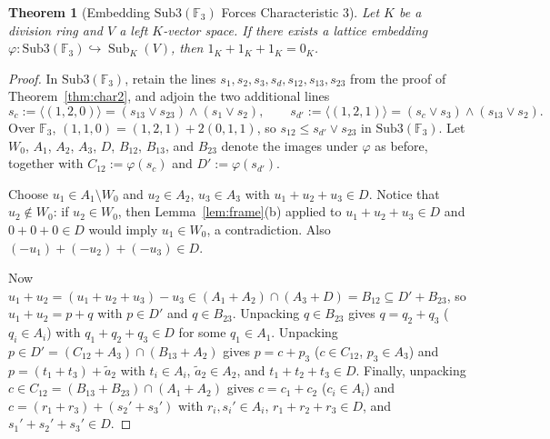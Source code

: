\documentclass[11pt]{article}
\newtheorem{theorem}{Theorem}[section]
\theoremstyle{definition}
\newcommand{\Sub}{\operatorname{Sub}}
\newcommand{\FF}{\mathbb{F}}
\begin{document}
\begin{theorem}[Embedding $\mathrm{Sub3}(\FF_3)$ Forces Characteristic $3$]\label{thm:char3}
Let $K$ be a division ring and $V$ a left $K$-vector space. If there exists a lattice
embedding $\varphi : \mathrm{Sub3}(\FF_3) \hookrightarrow \Sub_K(V)$, then
$1_K + 1_K + 1_K = 0_K$.
\end{theorem}
\begin{proof}
In $\mathrm{Sub3}(\FF_3)$, retain the lines $s_1, s_2, s_3, s_d, s_{12}, s_{13}, s_{23}$
from the proof of Theorem~\ref{thm:char2}, and adjoin the two additional lines
\[
  s_{c} := \langle (1, 2, 0) \rangle = (s_{13} \vee s_{23}) \wedge (s_1 \vee s_2), \qquad
  s_{d'} := \langle (1, 2, 1) \rangle = (s_c \vee s_3) \wedge (s_{13} \vee s_2).
\]
Over $\FF_3$, $(1, 1, 0) = (1, 2, 1) + 2(0, 1, 1)$, so $s_{12} \le s_{d'} \vee s_{23}$ in
$\mathrm{Sub3}(\FF_3)$. Let $W_0$, $A_1$, $A_2$, $A_3$, $D$, $B_{12}$, $B_{13}$, and
$B_{23}$ denote the images under $\varphi$ as before, together with
$C_{12} := \varphi(s_c)$ and $D' := \varphi(s_{d'})$.

Choose $u_1 \in A_1 \setminus W_0$ and $u_2 \in A_2$, $u_3 \in A_3$ with
$u_1 + u_2 + u_3 \in D$. Notice that $u_2 \notin W_0$: if $u_2 \in W_0$, then
Lemma~\ref{lem:frame}(b) applied to $u_1 + u_2 + u_3 \in D$ and $0 + 0 + 0 \in D$ would
imply $u_1 \in W_0$, a contradiction. Also $(-u_1) + (-u_2) + (-u_3) \in D$.

Now $u_1 + u_2 = (u_1 + u_2 + u_3) - u_3 \in (A_1 + A_2) \cap (A_3 + D) = B_{12}
\subseteq D' + B_{23}$, so $u_1 + u_2 = p + q$ with $p \in D'$ and $q \in B_{23}$.
Unpacking $q \in B_{23}$ gives $q = q_2 + q_3$ ($q_i \in A_i$) with
$q_1 + q_2 + q_3 \in D$ for some $q_1 \in A_1$. Unpacking
$p \in D' = (C_{12} + A_3) \cap (B_{13} + A_2)$ gives $p = c + p_3$ ($c \in C_{12}$,
$p_3 \in A_3$) and $p = (t_1 + t_3) + \tilde{a}_2$ with $t_i \in A_i$,
$\tilde{a}_2 \in A_2$, and $t_1 + t_2 + t_3 \in D$. Finally, unpacking
$c \in C_{12} = (B_{13} + B_{23}) \cap (A_1 + A_2)$ gives $c = c_1 + c_2$ ($c_i \in A_i$)
and $c = (r_1 + r_3) + (s_2' + s_3')$ with $r_i, s_i' \in A_i$,
$r_1 + r_2 + r_3 \in D$, and $s_1' + s_2' + s_3' \in D$.


\end{proof}
\end{document}

